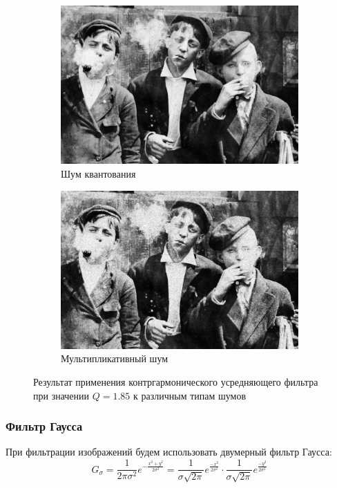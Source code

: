 \begin{figure}[ht]
\begin{subfigure}[b]{0.5\linewidth}
      \includegraphics[width=0.95\linewidth]{../Contraharmonic_Filter/Contraharmonic_Poisson_noise_(m,n=(3,_3),q=1.85).jpg} 
      \caption{Шум квантования} 
      \label{contraharmonic_1.85:e}
    \end{subfigure}%
    \begin{subfigure}[b]{0.5\linewidth}
        \centering
        \includegraphics[width=0.95\linewidth]{../Contraharmonic_Filter/Contraharmonic_Speckle_noise_(m,n=(3,_3),q=1.85).jpg} 
        \caption{Мультипликативный шум} 
        \label{contraharmonic_1.85:f} 
    \end{subfigure} 
    \caption{Результат применения контргармонического усредняющего фильтра при значении $Q = 1.85$ к различным типам шумов}
    \label{img:contraharmonic_1.85} 
  \end{figure}

  \FloatBarrier

\subsubsection{Фильтр Гаусса}
При фильтрации изображений будем использовать двумерный фильтр Гаусса:
\begin{equation}
   G_\sigma = \frac{1}{2\pi\sigma^2} e^{-\frac{x^2+y^2}{2\sigma^2}} = \frac{1}{\sigma\sqrt{2\pi}} e^{\frac{-x^2}{2\sigma^2}} \cdot \frac{1}{\sigma\sqrt{2\pi}} e^{\frac{-y^2}{2\sigma^2}}
\end{equation}


